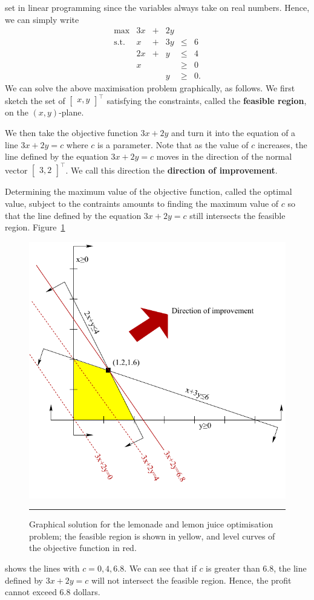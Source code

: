 set in linear programming since the variables always take on real
numbers. Hence, we can simply write \[\begin{array}{rrcrll}
\max & 3x & + & 2y & \\
\mbox{s.t.}
& x & + & 3y & \leq & 6 \\
& 2x & +&  y & \leq & 4 \\
& x &  & & \geq & 0 \\
& & & y & \geq & 0.
\end{array}\]
\newl We can solve the above maximisation problem graphically, as follows. We
first sketch the set of \(\begin{bmatrix} x, y\end{bmatrix}^{\!\top}\)
satisfying the constraints, called the \textbf{feasible region}, on the
\((x,y)\)-plane. \par We then take the objective function \(3x+2y\) and turn
it into the equation of a line \(3x+2y = c\) where \(c\) is a parameter.
Note that as the value of \(c\) increases, the line defined by the
equation \(3x+2y=c\) moves in the direction of the normal vector
\(\begin{bmatrix} 3,2\end{bmatrix}^{\!\top}\). We call this direction the
\textbf{direction of improvement}. \par Determining the maximum value of the objective
function, called the optimal value, subject to the contraints amounts to
finding the maximum value of \(c\) so that the line defined by the
equation \(3x+2y=c\) still intersects the feasible region. \newl Figure~\ref{fig:lemon}
\begin{figure}[!t]
\centering \includegraphics[width=0.7\linewidth]{Images/lemon} 
\caption[\small Graphical solution for the lemonade and lemon juice problem]{\small Graphical solution for the lemonade and lemon juice optimisation problem; the feasible region is shown in yellow, and level curves of the objective function in red. }\hrule \label{fig:lemon}
\end{figure}
shows the lines with \(c=0,4,6.8\). We can see that
if \(c\) is greater than 6.8, the line defined by \(3x+2y = c\) will not
intersect the feasible region. Hence, the profit cannot exceed 6.8
dollars.

